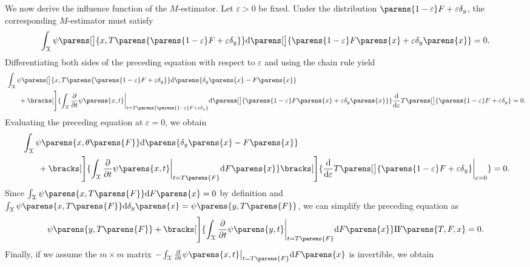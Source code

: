 \begin{example}[$M$-estimator]
	We now derive the influence function of the $M$-estimator. Let $\varepsilon > 0$ be fixed. Under the distribution $\parens{1 - \varepsilon} F + \varepsilon \delta_y$, the corresponding $M$-estimator must satisfy 
	\begin{align*}
		\int_{\calX} \psi \parens[\big]{x, T \parens{\parens{1 - \varepsilon} F + \varepsilon \delta_y}} \diff \parens[\big]{ \parens{1 - \varepsilon} F \parens{x} + \varepsilon \delta_y \parens{x} } = 0. 
	\end{align*}
	Differentiating both sides of the preceding equation with respect to $\varepsilon$ and using the chain rule yield
	\begin{align*}
		& \, \int_{\calX} \psi \parens[\big]{x, T \parens{\parens{1 - \varepsilon} F + \varepsilon \delta_y}} \diff \parens{ \delta_y \parens{x} - F \parens{x} } \nonumber \\ 
		& \qquad + \bracks[\Bigg]{\int_{\calX} \frac{\partial}{\partial t} \psi \parens{x, t} \bigg\vert_{t = T \parens{\parens{1 - \varepsilon} F + \varepsilon \delta_y}} \diff \parens[\big]{ \parens{1 - \varepsilon} F \parens{x} + \varepsilon \delta_y \parens{x} }} \frac{\diff}{\diff \varepsilon} T \parens[\big]{\parens{1 - \varepsilon} F + \varepsilon \delta_y} = 0. 
	\end{align*}
	Evaluating the preceding equation at $\varepsilon = 0$, we obtain 
	\begin{align*}
		& \, \int_{\calX} \psi \parens{x, \theta \parens{F}} \diff \parens{ \delta_y \parens{x} - F \parens{x} } \\ 
		& \qquad + \bracks[\Bigg]{\int_{\calX} \frac{\partial}{\partial t} \psi \parens{x, t} \bigg\vert_{t = T \parens{F}} \diff F \parens{x} } \bracks[\Bigg]{\frac{\diff}{\diff \varepsilon} T \parens[\big]{\parens{1 - \varepsilon} F + \varepsilon \delta_y} \bigg\vert_{\varepsilon = 0}} = 0. 
	\end{align*}
	Since $\int_{\calX} \psi \parens{x, T \parens{F}} \diff F \parens{x} = 0$ by definition and $\int_{\calX} \psi \parens{x, T \parens{F}} \diff \delta_y \parens{x} = \psi \parens{y, T \parens{F}}$, we can simplify the preceding equation as 
	\begin{align*}
		\psi \parens{y, T \parens{F}} + \bracks[\Bigg]{\int_{\calX} \frac{\partial}{\partial t} \psi \parens{y, t} \bigg\vert_{t = T \parens{F}} \diff F \parens{x} } \mathrm{IF} \parens{T, F, x} = 0. 
	\end{align*}
	Finally, if we assume the $m \times m$ matrix $- \int_{\calX} \frac{\partial}{\partial t} \psi \parens{x, t} \big\vert_{t = T \parens{F}} \diff F \parens{x}$ is invertible, we obtain 

\end{example}
